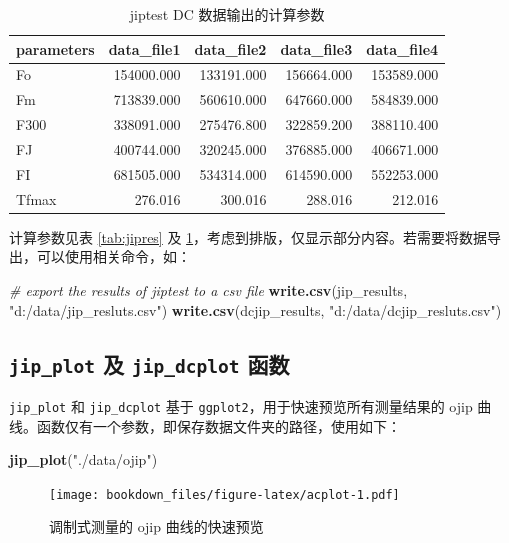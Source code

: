 \documentclass[
]{krantz}
\makeatletter
\newenvironment{Shaded}{\begin{snugshade}}{\end{snugshade}}
\newcommand{\CommentTok}[1]{\textcolor[rgb]{0.56,0.35,0.01}{\textit{#1}}}
\newcommand{\KeywordTok}[1]{\textcolor[rgb]{0.13,0.29,0.53}{\textbf{#1}}}
\newcommand{\NormalTok}[1]{#1}
\newcommand{\StringTok}[1]{\textcolor[rgb]{0.31,0.60,0.02}{#1}}
\newenvironment{kframe}{%
\medskip{}
\setlength{\fboxsep}{.8em}
 \def\at@end@of@kframe{}%
 \ifinner\ifhmode%
  \def\at@end@of@kframe{\end{minipage}}%
  \begin{minipage}{\columnwidth}%
 \fi\fi%
 \def\FrameCommand##1{\hskip\@totalleftmargin \hskip-\fboxsep
 \colorbox{shadecolor}{##1}\hskip-\fboxsep
     \hskip-\linewidth \hskip-\@totalleftmargin \hskip\columnwidth}%
 \MakeFramed {\advance\hsize-\width
   \@totalleftmargin\z@ \linewidth\hsize
   \@setminipage}}%
 {\par\unskip\endMakeFramed%
 \at@end@of@kframe}
\renewenvironment{Shaded}{\begin{kframe}}{\end{kframe}}
\makeatother
\begin{document}
\begin{longtable}[t]{lrrrr}
\caption{\label{tab:dcjipres}jiptest DC 数据输出的计算参数}\\
\toprule
parameters & data\_file1 & data\_file2 & data\_file3 & data\_file4\\
\midrule
Fo & 154000.000 & 133191.000 & 156664.000 & 153589.000\\
Fm & 713839.000 & 560610.000 & 647660.000 & 584839.000\\
F300 & 338091.000 & 275476.800 & 322859.200 & 388110.400\\
FJ & 400744.000 & 320245.000 & 376885.000 & 406671.000\\
FI & 681505.000 & 534314.000 & 614590.000 & 552253.000\\
\addlinespace
Tfmax & 276.016 & 300.016 & 288.016 & 212.016\\
\bottomrule
\end{longtable}

计算参数见表 \ref{tab:jipres} 及 \ref{tab:dcjipres}，考虑到排版，仅显示部分内容。若需要将数据导出，可以使用相关命令，如：

\begin{Shaded}
\begin{Highlighting}[]
\CommentTok{\# export the results of jiptest to a csv file}
\KeywordTok{write.csv}\NormalTok{(jip\_results, }\StringTok{"d:/data/jip\_resluts.csv"}\NormalTok{)}
\KeywordTok{write.csv}\NormalTok{(dcjip\_results, }\StringTok{"d:/data/dcjip\_resluts.csv"}\NormalTok{)}
\end{Highlighting}
\end{Shaded}

\hypertarget{plotfluor}{%
\subsection{\texorpdfstring{\texttt{jip\_plot} 及 \texttt{jip\_dcplot} 函数}{jip\_plot 及 jip\_dcplot 函数}}\label{plotfluor}}

\texttt{jip\_plot} 和 \texttt{jip\_dcplot} 基于 \texttt{ggplot2}，用于快速预览所有测量结果的 ojip 曲线。函数仅有一个参数，即保存数据文件夹的路径，使用如下：

\begin{Shaded}
\begin{Highlighting}[]
\KeywordTok{jip\_plot}\NormalTok{(}\StringTok{"./data/ojip"}\NormalTok{)}
\end{Highlighting}
\end{Shaded}

\begin{figure}
\centering
\texttt{[image: bookdown\_files/figure-latex/acplot-1.pdf]}
\caption{\label{fig:acplot}调制式测量的 ojip 曲线的快速预览}
\end{figure}
\end{document}
